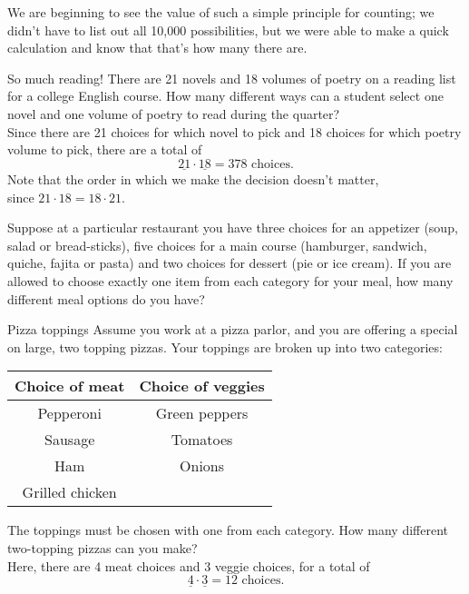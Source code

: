 We are beginning to see the value of such a simple principle for counting; we didn't have to list out all 10,000 possibilities, but we were able to make a quick calculation and know that that's how many there are.

\begin{example}[https://www.youtube.com/watch?v=MhWsP81KJ84]{So much reading!}
There are 21 novels and 18 volumes of poetry on a reading list for a college English course. How many different ways can a student select one novel and one volume of poetry to read during the quarter?\\

\sol
Since there are 21 choices for which novel to pick and 18 choices for which poetry volume to pick, there are a total of \[\underline{21} \cdot \underline{18} = 378 \textrm{ choices}.\]
Note that the order in which we make the decision doesn't matter,\\ since $21 \cdot 18 = 18 \cdot 21$.
\end{example}

\begin{try}
Suppose at a particular restaurant you have three choices for an appetizer (soup, salad or bread-sticks), five choices for a main course (hamburger, sandwich, quiche, fajita or pasta) and two choices for dessert (pie or ice cream). If you are allowed to choose exactly one item from each category for your meal, how many different meal options do you have?
\end{try}
\vspace{-0.25in}

\begin{example}[https://www.youtube.com/watch?v=R-yVVNKC0QQ]{Pizza toppings}
Assume you work at a pizza parlor, and you are offering a special on large, two topping pizzas. Your toppings are broken up into two categories:
\begin{center}
\begin{tabular}{|c|c|}\hline
\textbf{Choice of meat} & \textbf{Choice of veggies} \\ \hline
Pepperoni & Green peppers \\ \hline
Sausage & Tomatoes \\ \hline
Ham & Onions \\ \hline
Grilled chicken & \\ \hline 
\end{tabular} 
\end{center}
The toppings must be chosen with one from each category. How many different two-topping
pizzas can you make?\\

\sol
Here, there are 4 meat choices and 3 veggie choices, for a total of 
\[\underline{4} \cdot \underline{3} = 12 \textrm{ choices}.\]
\end{example}

